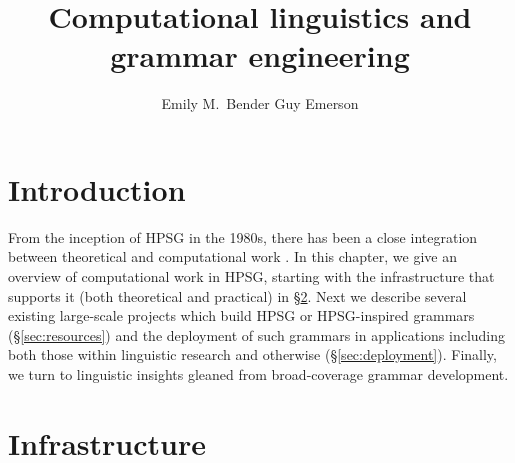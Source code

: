 \documentclass[output=paper]{langsci/langscibook}
\author{%
	Emily M.\ Bender\affiliation{University of Washington}%
	\lastand Guy Emerson\affiliation{University of Cambridge}
}
\title{Computational linguistics and grammar engineering}
\begin{document}
\label{chap-cl}



\section{Introduction}


From the inception of HPSG in the 1980s,
there has been a close integration between theoretical and computational work
\citep{FIXME-CLobit-or-other}.
In this chapter, we give an overview of computational work in HPSG, starting with the infrastructure that supports it (both theoretical and practical) in \S\ref{sec:infrastructure}. Next we describe several existing large-scale projects which build HPSG or HPSG-inspired grammars (\S\ref{sec:resources}) and the deployment of such grammars in applications including both those within linguistic research and otherwise (\S\ref{sec:deployment}).  Finally, we turn to linguistic insights gleaned from broad-coverage grammar development.



\section{Infrastructure}
\label{sec:infrastructure}

\end{document}
